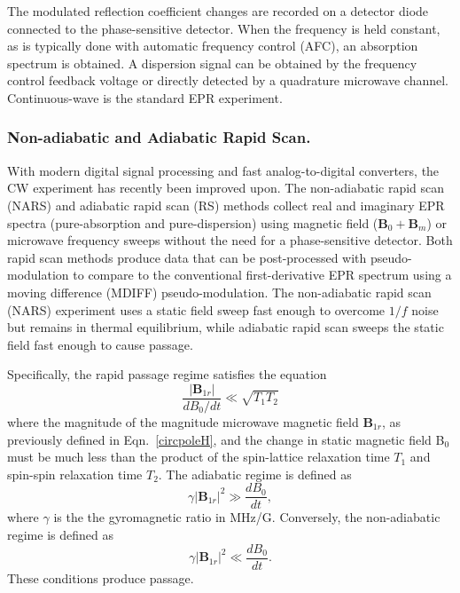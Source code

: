 The modulated reflection coefficient changes are recorded on a detector diode connected to the phase-sensitive detector. When the frequency is held constant, as is typically done with automatic frequency control (AFC), an absorption spectrum is obtained. \cite{poole1967electron} A dispersion signal can be obtained by the frequency control feedback voltage or directly detected by a quadrature microwave channel. Continuous-wave is the standard EPR experiment. 

\subsubsection*{Non-adiabatic and Adiabatic Rapid Scan.}
With modern digital signal processing and fast analog-to-digital converters, the CW experiment has recently been improved upon. The non-adiabatic rapid scan (NARS) \cite{KITTELL2011228, KITTELL201251, KITTELL201568, Hyde2013MDIFF, YU201558} and adiabatic rapid scan (RS) \cite{JOSHI200544,TSEITLIN200948, MITCHELL2012221, RScompare,MOSER2017} methods collect real and imaginary EPR spectra (pure-absorption and pure-dispersion) using magnetic field ($\mathbf{B}_0 + \mathbf{B}_m $) or microwave frequency sweeps without the need for a phase-sensitive detector. Both rapid scan methods produce data that can be post-processed with pseudo-modulation to compare to the conventional first-derivative EPR spectrum using a moving difference (MDIFF) pseudo-modulation. \cite{Hyde2013MDIFF} The non-adiabatic rapid scan (NARS) experiment uses a static field sweep fast enough to overcome $1/f$ noise but remains in thermal equilibrium, while adiabatic rapid scan sweeps the static field fast enough to cause passage. \cite{Weger1960} 

Specifically, the rapid passage regime satisfies the equation
\begin{equation}
    \frac{|\mathbf{B}_{1r}|}{d B_0/dt} \ll \sqrt{T_1 T_2}
\end{equation}
where the magnitude of the magnitude microwave magnetic field $\mathbf{B}_{1r}$, as previously defined in Eqn.~\ref{circpoleH}, and the change in static magnetic field B$_0$ must be much less than the product of the spin-lattice relaxation time $T_1$ and spin-spin relaxation time $T_2$. The adiabatic regime is defined as 
\begin{equation}
    \gamma |\mathbf{B}_{1r}|^2 \gg \frac{d B_0}{dt},
\end{equation}
where $\gamma$ is the the gyromagnetic ratio in MHz/G. Conversely, the non-adiabatic regime is defined as
\begin{equation}
    \gamma |\mathbf{B}_{1r}|^2 \ll \frac{d B_0}{dt}.
\end{equation}
These conditions produce passage. \cite{Weger1960}

